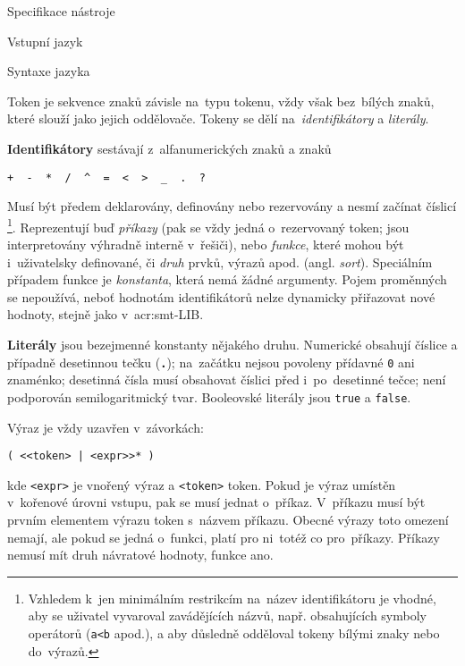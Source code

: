 \documentclass[thesis=M,czech]{FITthesis}[2012/06/26]
\newcommand{\acrlabel}[1]{acr:#1}
\newcommand{\acr}[1]{\acrshort{\acrlabel{#1}}}
\newcommand{\id}[1]{\texttt{#1}}
\newcommand{\hl}[1]{\textit{#1}}
\newcommand{\hll}[1]{\textbf{#1}}
\newcommand{\name}[1]{\hl{#1}}
\begin{document}
\begin{section}{Specifikace nástroje}
\begin{subsection}{Vstupní jazyk}
\begin{subsubsection}{Syntaxe jazyka}

\begin{paragraph}{Token}\label{p:design:spec:ilang:struct:token}
je sekvence znaků závisle na~typu tokenu,
vždy však bez~bílých znaků, které slouží jako jejich oddělovače.
Tokeny se dělí na~\name{identifikátory} a \name{literály}.

\hll{Identifikátory} sestávají z~alfanumerických znaků a znaků
\begin{center}
\id{+ \  - \  * \  / \  \^{} \  = \  < \  > \  \_ \  . \  ?}
\end{center}
Musí být předem deklarovány, definovány nebo rezervovány
a nesmí začínat číslicí%
\footnote{Vzhledem k~jen minimálním restrikcím na~název identifikátoru
je vhodné, aby se uživatel vyvaroval zavádějících názvů,
např. obsahujících symboly operátorů
(\id{a<b} apod.),
a aby důsledně odděloval tokeny bílými znaky
nebo do~výrazů.}.
Reprezentují buď \name{příkazy}
(pak se vždy jedná o~rezervovaný token;
jsou interpretovány výhradně interně v~řešiči),
nebo \name{funkce},
které mohou být i~uživatelsky definované,
či \name{druh} prvků, výrazů apod. (angl. \name{sort}).
Speciálním případem funkce je \name{konstanta},
která nemá žádné argumenty.
Pojem proměnných se nepoužívá,
neboť hodnotám identifikátorů nelze dynamicky přiřazovat nové hodnoty,
stejně jako v~\acr{smt}-LIB.

\hll{Literály} jsou bezejmenné konstanty
nějakého druhu.
Numerické obsahují číslice a případně desetinnou tečku (\id{\hll{.}});
na~začátku nejsou povoleny přídavné \id{0} ani znaménko;
desetinná čísla musí obsahovat číslici před i~po~desetinné tečce;
není podporován semilogaritmický tvar.
Booleovské literály jsou \id{true} a \id{false}.
\end{paragraph} %


\begin{paragraph}{Výraz}\label{p:design:spec:ilang:struct:expr}
je vždy uzavřen v~závorkách:
\begin{center}
\id{( <{}<token> | <expr>{}>* )}
\end{center}
kde \id{<expr>} je vnořený výraz
a \id{<token>} token.
Pokud je výraz umístěn v~kořenové úrovni vstupu,
pak se musí jednat o~příkaz.
V~příkazu musí být prvním elementem výrazu
token s~názvem příkazu.
Obecné výrazy toto omezení nemají,
ale pokud se jedná o~funkci,
platí pro ni~totéž co pro~příkazy.
Příkazy nemusí mít druh návratové hodnoty,
funkce ano.


\end{paragraph}
\end{subsubsection}
\end{subsection}
\end{section}
\end{document}
